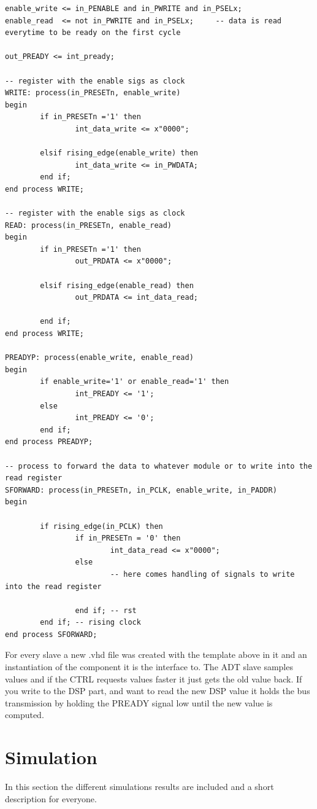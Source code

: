 \documentclass[%
	a4paper,
]
{article}
\begin{document}
\begin{lstlisting}
enable_write <= in_PENABLE and in_PWRITE and in_PSELx;
enable_read  <= not in_PWRITE and in_PSELx;     -- data is read everytime to be ready on the first cycle

out_PREADY <= int_pready;

-- register with the enable sigs as clock
WRITE: process(in_PRESETn, enable_write)
begin
        if in_PRESETn ='1' then
                int_data_write <= x"0000";

        elsif rising_edge(enable_write) then
                int_data_write <= in_PWDATA;
        end if;
end process WRITE;

-- register with the enable sigs as clock
READ: process(in_PRESETn, enable_read)
begin
        if in_PRESETn ='1' then
                out_PRDATA <= x"0000";

        elsif rising_edge(enable_read) then
                out_PRDATA <= int_data_read;

        end if;
end process WRITE;

PREADYP: process(enable_write, enable_read)
begin
        if enable_write='1' or enable_read='1' then
                int_PREADY <= '1';
        else
                int_PREADY <= '0';
        end if;
end process PREADYP;

-- process to forward the data to whatever module or to write into the read register
SFORWARD: process(in_PRESETn, in_PCLK, enable_write, in_PADDR)
begin

        if rising_edge(in_PCLK) then
                if in_PRESETn = '0' then
                        int_data_read <= x"0000";
                else
                        -- here comes handling of signals to write into the read register

                end if; -- rst
        end if; -- rising clock
end process SFORWARD;
\end{lstlisting}

For every slave a new .vhd file was created with the template above in it and an 
instantiation of the component it is the interface to. The ADT slave samples values
and if the CTRL requests values faster it just gets the old value back. If you write
to the DSP part, and want to read the new DSP value it holds the bus transmission by 
holding the PREADY signal low until the new value is computed.



\section{Simulation}
In this section the different simulations results are included and a short description for
everyone.
\end{document}

